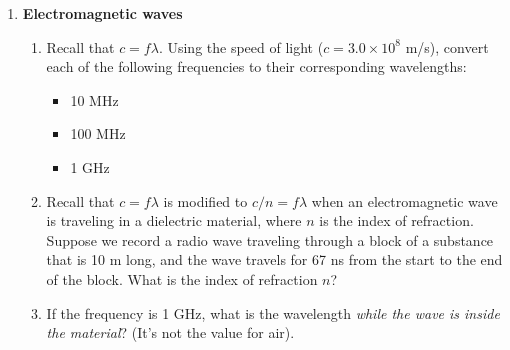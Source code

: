 \documentclass[10pt]{article}
\begin{document}
\begin{enumerate}
\begin{enumerate}
\begin{itemize}
\item A: Counter-clockwise, Faraday's Law
\item B: Counter-clockwise, Amp\`{e}re's Law
\item C: Clockwise, Faraday's Law
\item D: Clockwise, Amp\`{e}re's Law
\end{itemize}
\begin{figure}[hb]
\centering
\texttt{[image: figures/tok.png]}
\caption{\label{fig:tok} The basic premise of a tokamak, containing plasma for fusion reactions.}
\end{figure}
\item Describe the motion of positively charged particles in the tokamak if they experience the toroidal magnetic field as a uniform field directed around the circle. \\ \vspace{2cm}
\item The velocity of a fluid flowing through the line in Fig. \ref{fig:hall} is being measured using the Hall effect.  If the magnetic field is $10$ gauss ($10^{-3}$ T), the line has $l = 1$ cm, and $\epsilon = 10$ mV, what is the velocity of the fluid?  \\ \vspace{2cm}
\begin{figure}[hb]
\centering
\texttt{[image: figures/hall.png]}
\caption{\label{fig:hall} A hall voltage measurement of the velocity of a fluid.}
\end{figure}
\end{enumerate}
\item \textbf{Electromagnetic waves}
\begin{enumerate}
\item Recall that $c = f\lambda$.  Using the speed of light ($c = 3.0 \times 10^8$ m/s), convert each of the following frequencies to their corresponding wavelengths:
\begin{itemize}
\item 10 MHz
\item 100 MHz
\item 1 GHz
\end{itemize}
\item Recall that $c = f\lambda$ is modified to $c/n = f\lambda$ when an electromagnetic wave is traveling in a dielectric material, where $n$ is the index of refraction.  Suppose we record a radio wave traveling through a block of a substance that is 10 m long, and the wave travels for 67 ns from the start to the end of the block.  What is the index of refraction $n$? \\ \vspace{2cm}
\item If the frequency is 1 GHz, what is the wavelength \textit{while the wave is inside the material}? (It's not the value for air).
\end{enumerate}
\end{enumerate}
\end{document}
